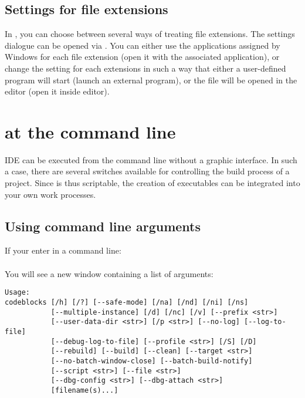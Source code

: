 \subsection{Settings for file extensions}\label{sec:file_extension}

In \codeblocks, you can choose between several ways of treating file extensions. The settings dialogue can be opened via .
You can either use the applications assigned by Windows for each file extension (open it with the associated application), or change the setting for each extensions in such a way that either a user-defined program will start (launch an external program), or the file will be opened in the \codeblocks editor (open it inside \codeblocks editor).


\section{\codeblocks at the command line}

IDE \codeblocks can be executed from the command line without a graphic interface. In such a case, there are several switches available for controlling the build process of a project. Since \codeblocks is thus scriptable, the creation of executables can be integrated into your own work processes.

\subsection{Using command line arguments}

If your enter in a command line:\\
\\
You will see a new window containing a list of arguments:
\begin{lstlisting}
Usage:
codeblocks [/h] [/?] [--safe-mode] [/na] [/nd] [/ni] [/ns]
           [--multiple-instance] [/d] [/nc] [/v] [--prefix <str>]
           [--user-data-dir <str>] [/p <str>] [--no-log] [--log-to-file]
           [--debug-log-to-file] [--profile <str>] [/S] [/D]
           [--rebuild] [--build] [--clean] [--target <str>]
           [--no-batch-window-close] [--batch-build-notify]
           [--script <str>] [--file <str>]
           [--dbg-config <str>] [--dbg-attach <str>]
           [filename(s)...]
\end{lstlisting}


